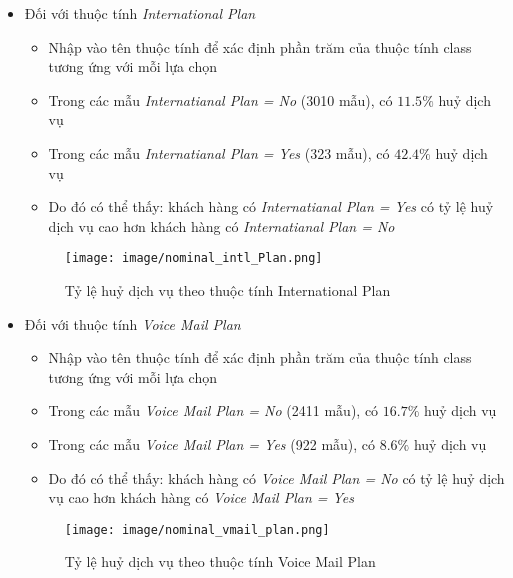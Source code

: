 \documentclass[a4paper, 12pt]{article}
\begin{document}
\begin{itemize}
    \item Đối với thuộc tính \textit{International Plan}
    \begin{itemize}
        \item Nhập vào tên thuộc tính để xác định phần trăm của thuộc tính class tương ứng với mỗi lựa chọn 
        \item Trong các mẫu \textit{Internatianal Plan = No} (3010 mẫu), có $11.5\%$ huỷ dịch vụ
        \item Trong các mẫu \textit{Internatianal Plan = Yes} (323 mẫu), có $42.4\%$ huỷ dịch vụ
        \item Do đó có thể thấy: khách hàng có \textit{Internatianal Plan = Yes} có tỷ lệ huỷ dịch vụ cao hơn khách hàng có \textit{Internatianal Plan = No}
    \end{itemize}
    \begin{figure}[H]
        \begin{center}
            \texttt{[image: image/nominal\_intl\_Plan.png]}
            \caption{Tỷ lệ huỷ dịch vụ theo thuộc tính International Plan}
        \end{center}
    \end{figure}

    \item Đối với thuộc tính \textit{Voice Mail Plan}
    \begin{itemize}
        \item Nhập vào tên thuộc tính để xác định phần trăm của thuộc tính class tương ứng với mỗi lựa chọn 
        \item Trong các mẫu \textit{Voice Mail Plan = No} (2411 mẫu), có $16.7\%$ huỷ dịch vụ
        \item Trong các mẫu \textit{Voice Mail Plan = Yes} (922 mẫu), có $8.6\%$ huỷ dịch vụ
        \item Do đó có thể thấy: khách hàng có \textit{Voice Mail Plan = No} có tỷ lệ huỷ dịch vụ cao hơn khách hàng có \textit{Voice Mail Plan = Yes}
    \end{itemize}
    \begin{figure}[H]
        \begin{center}
            \texttt{[image: image/nominal\_vmail\_plan.png]}
            \caption{Tỷ lệ huỷ dịch vụ theo thuộc tính Voice Mail Plan}
        \end{center}
    \end{figure}
\end{itemize}
\end{document}
